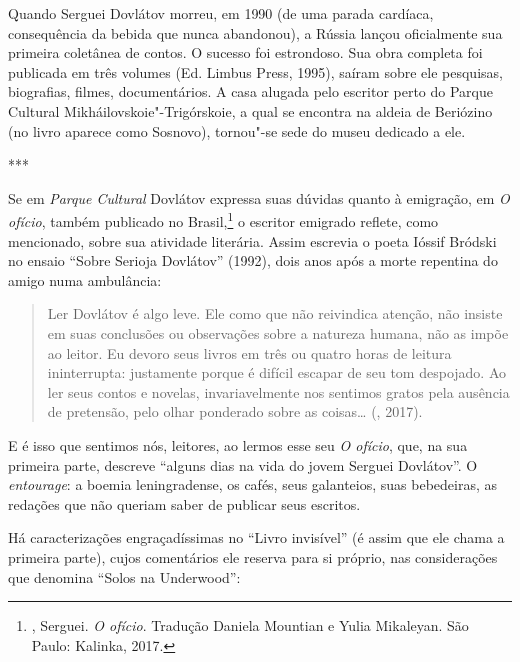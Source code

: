 Quando Serguei Dovlátov morreu, em 1990 (de uma parada cardíaca, consequência
da bebida que nunca abandonou), a Rússia lançou oficialmente sua
primeira coletânea de contos. O sucesso foi estrondoso. Sua obra
completa foi publicada em três volumes (Ed. Limbus Press, 1995), saíram sobre ele pesquisas,
biografias, filmes, documentários. A casa alugada pelo escritor perto do Parque Cultural Mikháilovskoie"-Trigórskoie, a qual
se encontra na aldeia de Beriózino (no livro aparece como Sosnovo),
tornou"-se sede do museu dedicado a ele.

\begin{center}
***
\end{center}

Se em \emph{Parque Cultural} Dovlátov expressa suas dúvidas quanto
 à emigração, em \emph{O ofício}, também publicado no Brasil,\footnote{, Serguei. \emph{O ofício}. Tradução
 Daniela Mountian e Yulia Mikaleyan. São Paulo: Kalinka, 2017.} o 
escritor emigrado reflete, como mencionado, sobre sua atividade 
literária. Assim escrevia o poeta Ióssif Bródski no ensaio ``Sobre Serioja Dovlátov'' (1992),
dois anos após a morte repentina do amigo numa ambulância:

\begin{quotation}
Ler Dovlátov é algo leve. Ele como que não reivindica atenção, não 
insiste em suas conclusões ou observações sobre a natureza humana, não
 as impõe ao leitor. Eu devoro seus livros em três ou quatro horas de 
leitura ininterrupta: justamente porque é difícil escapar de seu tom
 despojado. Ao ler seus contos e novelas, invariavelmente nos sentimos
 gratos pela ausência de pretensão, pelo olhar ponderado sobre as
 coisas\ldots{} (, 2017).
\end{quotation}

E é isso que sentimos nós, leitores, ao lermos esse seu \emph{O ofício}, que, na
sua primeira parte, descreve ``alguns dias na vida do jovem Serguei
Dovlátov''. O \emph{entourage}: a boemia leningradense, os cafés, seus galanteios,
suas bebedeiras, as redações que não queriam saber de publicar seus escritos.

Há caracterizações engraçadíssimas no ``Livro invisível''
(é assim que ele chama a primeira parte), cujos comentários ele 
reserva para si próprio, nas considerações que denomina ``Solos
 na Underwood'': 

